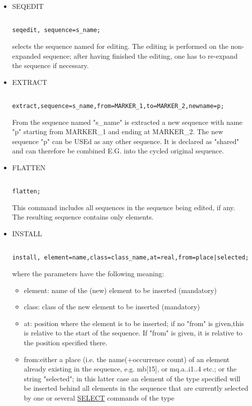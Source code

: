\begin{itemize}
	\item SEQEDIT
\begin{verbatim}

seqedit, sequence=s_name;
\end{verbatim} selects the sequence named for editing. The editing is performed on the non-expanded sequence; after having finished the editing, one has to re-expand the sequence if necessary. 




	\item EXTRACT
\begin{verbatim}

extract,sequence=s_name,from=MARKER_1,to=MARKER_2,newname=p;
\end{verbatim} From the sequence named "s\_name" is extracted a new sequence with name "p" starting from MARKER\_1 and ending at MARKER\_2. The new sequence "p" can be USEd as any other sequence. It is declared as "shared" and can therefore be combined E.G. into the cycled original sequence. 


	\item FLATTEN
\begin{verbatim}

flatten;
\end{verbatim} This command includes all sequences in the sequence being edited, if any. The resulting sequence contains only elements. 


	\item INSTALL
\begin{verbatim}

install, element=name,class=class_name,at=real,from=place|selected;
\end{verbatim} where the parameters have the following meaning: 
\begin{itemize}
	\item element: name of the (new) element to be inserted (mandatory) 
	\item class: class of the new element to be inserted (mandatory) 
	\item at: position where the element is to be inserted; if no "from" is given,this is relative to the start of the sequence. If "from" is given, it is relative to the position specified there. 
	\item from:either a place (i.e. the name(+occurrence count) of an element already existing in the sequence, e.g. mb[15], or mq.a..i1..4 etc.; or the string "selected"; in this latter case an element of the type specified will be inserted behind all elements in the sequence that are currently selected by one or several \href{../Introduction/select.html}{SELECT} commands of the type 
\begin{verbatim}


\end{verbatim}
\end{itemize}
\end{itemize}
